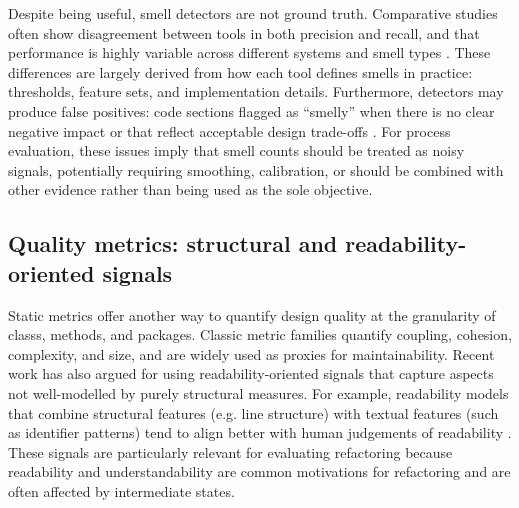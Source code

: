 Despite being useful, smell detectors are not ground truth. Comparative studies often show disagreement between tools in both precision and recall, and that performance is highly variable across different systems and smell types \cite{paiva2017evaluation}. These differences are largely derived from how each tool defines smells in practice: thresholds, feature sets, and implementation details. Furthermore, detectors may produce false positives: code sections flagged as ``smelly'' when there is no clear negative impact or that reflect acceptable design trade-offs \cite{arcellifontana2016falsepositives}. For process evaluation, these issues imply that smell counts should be treated as noisy signals, potentially requiring smoothing, calibration, or should be combined with other evidence rather than being used as the sole objective.

\subsection{Quality metrics: structural and readability-oriented signals}
Static metrics offer another way to quantify design quality at the granularity of classs, methods, and packages. Classic metric families quantify coupling, cohesion, complexity, and size, and are widely used as proxies for maintainability. Recent work has also argued for using readability-oriented signals that capture aspects not well-modelled by purely structural measures. For example, readability models that combine structural features (e.g. line structure) with textual features (such as  identifier patterns) tend to align better with human judgements of readability \cite{scalabrino2018readability}. These signals are particularly relevant for evaluating refactoring because readability and understandability are common motivations for refactoring and are often affected by intermediate states.

